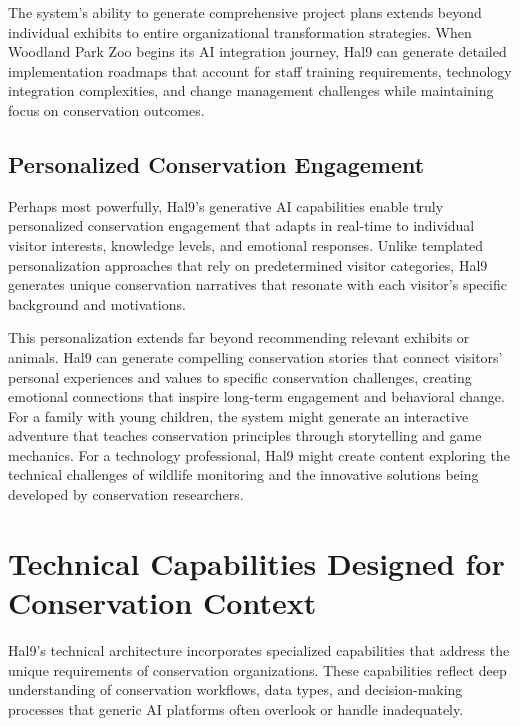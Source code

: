 \documentclass[
  Letterpaper,
]{scrbook}
\begin{document}
The system's ability to generate comprehensive project plans extends
beyond individual exhibits to entire organizational transformation
strategies. When Woodland Park Zoo begins its AI integration journey,
Hal9 can generate detailed implementation roadmaps that account for
staff training requirements, technology integration complexities, and
change management challenges while maintaining focus on conservation
outcomes.

\subsection{Personalized Conservation
Engagement}\label{personalized-conservation-engagement}

Perhaps most powerfully, Hal9's generative AI capabilities enable truly
personalized conservation engagement that adapts in real-time to
individual visitor interests, knowledge levels, and emotional responses.
Unlike templated personalization approaches that rely on predetermined
visitor categories, Hal9 generates unique conservation narratives that
resonate with each visitor's specific background and motivations.

This personalization extends far beyond recommending relevant exhibits
or animals. Hal9 can generate compelling conservation stories that
connect visitors' personal experiences and values to specific
conservation challenges, creating emotional connections that inspire
long-term engagement and behavioral change. For a family with young
children, the system might generate an interactive adventure that
teaches conservation principles through storytelling and game mechanics.
For a technology professional, Hal9 might create content exploring the
technical challenges of wildlife monitoring and the innovative solutions
being developed by conservation researchers.

\section{Technical Capabilities Designed for Conservation
Context}\label{technical-capabilities-designed-for-conservation-context}

Hal9's technical architecture incorporates specialized capabilities that
address the unique requirements of conservation organizations. These
capabilities reflect deep understanding of conservation workflows, data
types, and decision-making processes that generic AI platforms often
overlook or handle inadequately.
\end{document}
